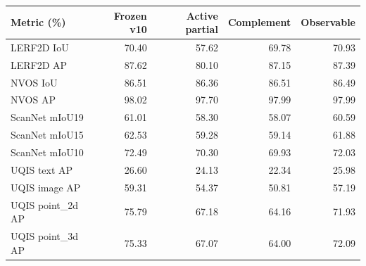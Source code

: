 \begin{tabular}{lrrrr}
\toprule
Metric (\%) & Frozen v10 & Active partial & Complement & Observable \\
\midrule
LERF2D IoU & 70.40 & 57.62 & 69.78 & 70.93 \\
LERF2D AP & 87.62 & 80.10 & 87.15 & 87.39 \\
NVOS IoU & 86.51 & 86.36 & 86.51 & 86.49 \\
NVOS AP & 98.02 & 97.70 & 97.99 & 97.99 \\
ScanNet mIoU19 & 61.01 & 58.30 & 58.07 & 60.59 \\
ScanNet mIoU15 & 62.53 & 59.28 & 59.14 & 61.88 \\
ScanNet mIoU10 & 72.49 & 70.30 & 69.93 & 72.03 \\
UQIS text AP & 26.60 & 24.13 & 22.34 & 25.98 \\
UQIS image AP & 59.31 & 54.37 & 50.81 & 57.19 \\
UQIS point\_2d AP & 75.79 & 67.18 & 64.16 & 71.93 \\
UQIS point\_3d AP & 75.33 & 67.07 & 64.00 & 72.09 \\
\bottomrule
\end{tabular}
